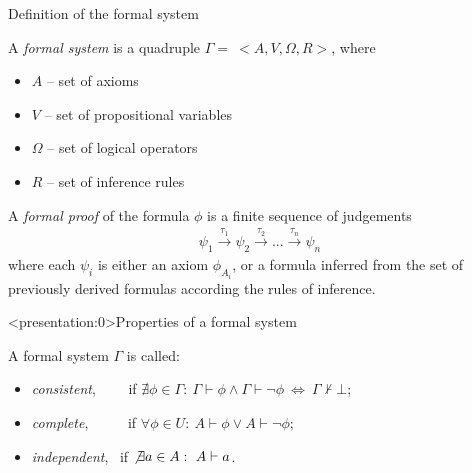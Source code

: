 \documentclass[aspectratio=169, fleqn]{beamer}
\begin{document}
\begin{frame}{Definition of the formal system}

A \textit{formal system} is a quadruple $\Gamma = \ <A, V, \Omega, R>$, where
\begin{itemize}
  \item $A$ -- set of axioms
  \item $V$ -- set of propositional variables
  \item $\Omega$ -- set of logical operators
  \item $R$ -- set of inference rules
\end{itemize} 

\vspace{15pt}

A \textit{formal proof} of the formula $\phi$ is a finite sequence of judgements 
\begin{align*}
\psi_1 \xrightarrow{\tau_1} \psi_2 \xrightarrow{\tau_2} ... \xrightarrow{\tau_n} \psi_n 
\end{align*}
where each $\psi_i$ is either an axiom $\phi_{A_i}$, or a formula inferred from the set of previously derived formulas according the rules of inference.

\end{frame}


\begin{frame}<presentation:0>{Properties of a formal system}

A formal system $\Gamma$ is called:

\begin{itemize}
\item  \textit{consistent}, \ \ \ \ if $\nexists \phi \in \Gamma: \ \Gamma \vdash \phi \land  \Gamma \vdash \neg \phi  \ \Leftrightarrow \ \Gamma \nvdash \bot$; 
\\ \vspace{3pt}
\item \textit{complete}, \ \ \ \ \ if $\forall \phi \in U: \ A \vdash \phi \lor A \vdash \neg \phi$;
\\ \vspace{3pt}
\item \textit{independent}, \ if $\not \exists a \in A: \ A \vdash a$.
\end{itemize}

\end{frame}
\end{document}
